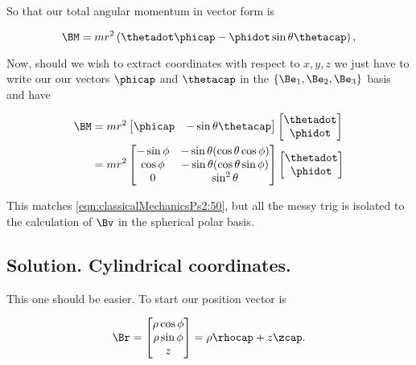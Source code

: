 So that our total angular momentum in vector form is

\begin{equation}\label{eqn:classicalMechanicsPs2:310}
\BM = m r^2 
\left( \thetadot \phicap - \phidot \sin\theta \thetacap \right),
\end{equation}

Now, should we wish to extract coordinates with respect to $x,y,z$ we just have to write our our vectors $\phicap$ and $\thetacap$ in the $\{\Be_1, \Be_2, \Be_3\}$ basis and have

\begin{align*}
\BM 
&= 
m r^2 
\begin{bmatrix}
\phicap & -\sin\theta \thetacap 
\end{bmatrix}
\begin{bmatrix}
\thetadot \\
\phidot
\end{bmatrix} \\
&=
m r^2 
\begin{bmatrix}
-\sin\phi & -\sin\theta(\cos\theta \cos\phi) \\
\cos\phi & -\sin\theta(\cos\theta \sin\phi) \\
0 & \sin^2\theta 
\end{bmatrix}
\begin{bmatrix}
\thetadot \\
\phidot
\end{bmatrix} \\
\end{align*}

This matches \ref{eqn:classicalMechanicsPs2:50}, but all the messy trig is isolated to the calculation of $\Bv$ in the spherical polar basis.

\subsection{Solution.  Cylindrical coordinates.}

This one should be easier.  To start our position vector is

\begin{equation}\label{eqn:classicalMechanicsPs2:90}
\Br =
\begin{bmatrix}
\rho \cos\phi \\
\rho \sin\phi \\
z
\end{bmatrix}
= \rho \rhocap + z \zcap.
\end{equation}

